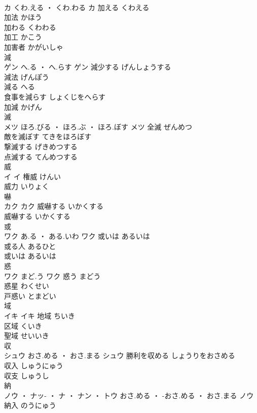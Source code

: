 \documentclass[8pt]{extreport}
\begin{document}
\begin{CJK}{UTF8}{min}
\\	カ	くわ.える ・ くわ.わる	カ	加える	くわえる	
\\	加法	かほう	
\\	加わる	くわわる	
\\	加工	かこう	
\\	加害者	かがいしゃ	
\\	減	
\\	ゲン	へ.る ・ へ.らす	ゲン	減少する	げんしょうする	
\\	減法	げんぽう	
\\	減る	へる	
\\	食事を減らす	しょくじをへらす	
\\	加減	かげん	
\\	滅	
\\	メツ	ほろ.びる ・ ほろ.ぶ ・ ほろ.ぼす	メツ	全滅	ぜんめつ	
\\	敵を滅ぼす	てきをほろぼす	
\\	撃滅する	げきめつする	
\\	点滅する	てんめつする	
\\	威	
\\	イ		イ	権威	けんい	
\\	威力	いりょく	
\\	嚇	
\\	カク		カク	威嚇する	いかくする	
\\	威嚇する	いかくする	
\\	或	
\\	ワク	あ.る ・ ある.いわ	ワク	或いは	あるいは	
\\	或る人	あるひと	
\\	或いは	あるいは	
\\	惑	
\\	ワク	まど.う	ワク	惑う	まどう	
\\	惑星	わくせい	
\\	戸惑い	とまどい	
\\	域	
\\	イキ		イキ	地域	ちいき	
\\	区域	くいき	
\\	聖域	せいいき	
\\	収	
\\	シュウ	おさ.める ・ おさ.まる	シュウ	勝利を収める	しょうりをおさめる	
\\	収入	しゅうにゅう	
\\	収支	しゅうし	
\\	納	
\\	ノウ ・ ナッ- ・ ナ ・ ナン ・ トウ	おさ.める ・ -おさ.める ・ おさ.まる	ノウ	納入	のうにゅう	

\end{CJK}
\end{document}
